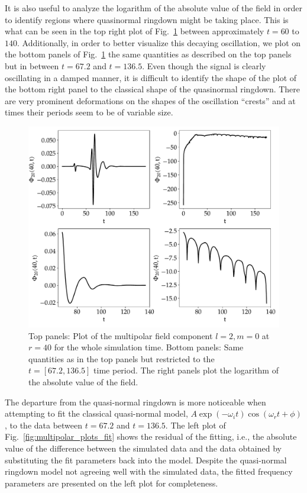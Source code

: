 It is also useful to analyze the logarithm of the absolute value of the field in order to identify regions where quasinormal ringdown might be taking place. This is what can be seen in the top right plot of Fig.~\ref{fig:multipolar_plots} between approximately $t=60$ to $140$. Additionally, in order to better visualize this decaying oscillation, we plot on the bottom panels of Fig.~\ref{fig:multipolar_plots} the same quantities as described on the top panels but in between $t=67.2$ and $t=136.5$. Even though the signal is clearly oscillating in a damped manner, it is difficult to identify the shape of the plot of the bottom right panel to the classical shape of the quasinormal ringdown. There are very prominent deformations on the shapes of the oscillation ``crests'' and at times their periods seem to be of variable size.

\begin{figure}[h]
  \centering
  \includegraphics[width=\linewidth]{img/wave_scattering/multipolar_plots}
  \caption{Top panels: Plot of the multipolar field component $l=2,m=0$ at $r=40$ for the whole simulation time. Bottom panels: Same quantities as in the top panels but restricted to the $t=[67.2, 136.5]$ time period. The right panels plot the logarithm of the absolute value of the field.}
  \label{fig:multipolar_plots}
\end{figure}

The departure from the quasi-normal ringdown is more noticeable when attempting to fit the classical quasi-normal model, $A \exp(-\omega_i t) \cos(\omega_r t + \phi)$, to the data between $t=67.2$ and $t=136.5$. The left plot of Fig.~\ref{fig:multipolar_plots_fit} shows the residual of the fitting, i.e., the absolute value of the difference between the simulated data and the data obtained by substituting the fit parameters back into the model. Despite the quasi-normal ringdown model not agreeing well with the simulated data, the fitted frequency parameters are presented on the left plot for completeness.

